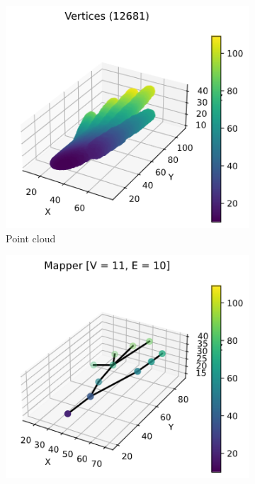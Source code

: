 \documentclass{article}
\begin{document}
\begin{figure}[ht]
    \centering
    \begin{subfigure}[c]{0.3\columnwidth}
        \centering
        \includegraphics[width=\textwidth]{hand-point-cloud}
        \caption{Point cloud}
        \label{fig:hand-points}
    \end{subfigure}
    \begin{subfigure}[c]{0.3\columnwidth}
        \centering
        \includegraphics[width=\textwidth]{hand-graph-3d}

\end{subfigure}
\end{figure}
\end{document}
